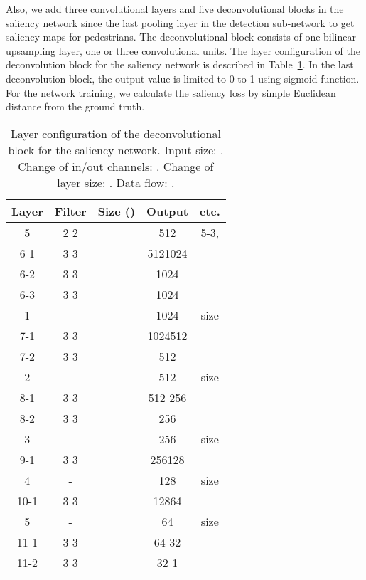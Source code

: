 \documentclass[journal]{IEEEtran}
\begin{document}
Also, we add three convolutional layers and five deconvolutional blocks in the saliency network since the last pooling layer in the detection sub-network to get saliency maps for pedestrians. The deconvolutional block consists of one bilinear upsampling layer, one or three convolutional units. The layer configuration of the deconvolution block for the saliency network is described in Table~\ref{table:deconv_block_details}. In the last deconvolution block, the output value is limited to 0 to 1 using sigmoid function. For the network training, we calculate the saliency loss  by simple Euclidean distance from the ground truth.

\begin{table}[t]
\caption{Layer configuration of the deconvolutional block for the saliency network. Input size: . Change of in/out channels: . Change of layer size: . Data flow: .}
\small\addtolength{\tabcolsep}{-3pt}
\begin{center}
\begin{tabular}[c]{|c|c|c|c|c|}
\hline
\bf{Layer} & \bf{Filter} & \bf{Size ()} & \bf{Output} & \bf{etc.}  \\
\hline
 5    & 2  2 &   & 512 &  5-3, \\
 6-1  & 3  3 &   & 5121024 & \\
 6-2  & 3  3 &   & 1024 & \\
 6-3  & 3  3 &   & 1024 & \\
\hline
 1  & -          &   & 1024 & size  \\
 7-1  & 3  3 &   & 1024512 & \\
 7-2  & 3  3 &   & 512 & \\
\hline
 2  & - &  & 512 & size  \\
 8-1  & 3  3 &   & 512  256 & \\
 8-2  & 3  3 &   & 256 & \\
\hline
 3  & -          &   & 256 & size  \\
 9-1  & 3  3 &   & 256128 & \\
\hline
 4  & -          &  & 128 & size  \\
 10-1  & 3  3 &   & 12864 & \\
\hline
 5  & -          &  & 64 & size  \\
 11-1  & 3  3 &   & 64  32 & \\
 11-2  & 3  3 &   & 32  1 & \\
\hline
\end{tabular}
\end{center}
\label{table:deconv_block_details}
\end{table}
\end{document}
